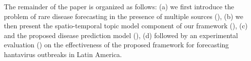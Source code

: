 \documentclass[conference]{IEEEtran}
\newcommand{\todo}[1]{\textcolor{red}{{TODO: #1}}}
\begin{document}
The remainder of the paper is organized as follows: (a) we first introduce the problem of rare disease forecasting in the presence of multiple sources (), (b) we then present the spatio-temporal topic model component of our framework (), (c) and the proposed disease prediction model  (), (d) followed by an experimental evaluation () on the effectiveness of the proposed framework for forecasting hantavirus outbreaks in Latin America. 


%
\end{document}
